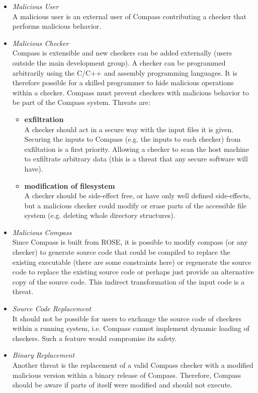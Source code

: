 \begin{itemize}
\item \emph{Malicious User} \\ 
  A malicious user is an external user of Compass contributing a checker that performs malicious behavior.
\item \emph{Malicious Checker} \\ 
  Compass is extensible and new checkers can be added externally (users outside the main development group).
  A checker can be programmed arbitrarily using the C/C++ and assembly programming languages. 
  It is therefore possible for a skilled programmer to hide malicious operations within a
  checker.  Compass must prevent checkers with malicious behavior to be part of the
  Compass system. Threats are:
   \begin{itemize}
      \item {\bf exfiltration} \\
         A checker should act in a secure way with the input files it is given.
         Securing the inputs to Compass (e.g. the inputs to each checker) from 
         exfiltation is a first priority. Allowing a checker to scan the host 
         machine to exfiltrate arbitrary data (this is a threat that any secure
         software will have).
      \item {\bf modification of filesystem} \\
         A checker should be side-effect free, or have only well defined side-effects, 
         but a malicious checker could modify or erase parts of the accessible file 
         system (e.g. deleting whole directory structures).
   \end{itemize} 

\item \emph{Malicious Compass} \\
    Since Compass is built from ROSE, it is possible to modify compass (or any checker) 
    to generate source code that could be compiled to replace the existing executable
    (there are some constraints here) or regenerate the source code to replace the 
    existing source code or perhaps just provide an alternative copy of the source code.
    This indirect transformation of the input code is a threat.

\item \emph{Source Code Replacement} \\ It should not be possible for users to exchange the
    source code of checkers within a running system, i.e. Compass cannot implement dynamic
    loading of checkers. Such a feature would compromise its safety.

\item \emph{Binary Replacement} \\ Another threat is the replacement of a valid Compass
    checker with a modified malicious version within a binary release of Compass.
    Therefore, Compass should be aware if parts of itself were modified and should not
    execute.

\end{itemize} 

